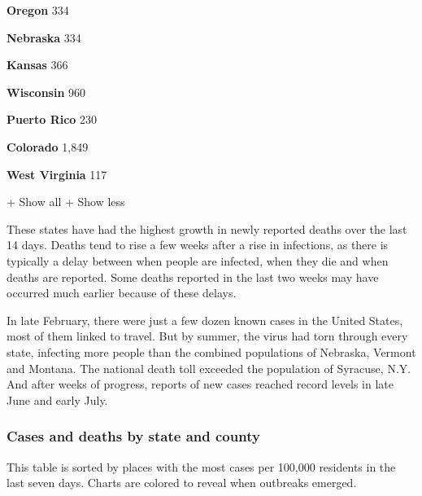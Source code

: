 \textbf{Oregon} 334

\href{https://www.nytimes.com/interactive/2020/us/nebraska-coronavirus-cases.html}{}

\textbf{Nebraska} 334

\href{https://www.nytimes.com/interactive/2020/us/kansas-coronavirus-cases.html}{}

\textbf{Kansas} 366

\href{https://www.nytimes.com/interactive/2020/us/wisconsin-coronavirus-cases.html}{}

\textbf{Wisconsin} 960

\href{https://www.nytimes.com/interactive/2020/us/puerto-rico-coronavirus-cases.html}{}

\textbf{Puerto Rico} 230

\href{https://www.nytimes.com/interactive/2020/us/colorado-coronavirus-cases.html}{}

\textbf{Colorado} 1,849

\href{https://www.nytimes.com/interactive/2020/us/west-virginia-coronavirus-cases.html}{}

\textbf{West Virginia} 117

+ Show all + Show less

These states have had the highest growth in newly reported deaths over
the last 14 days. Deaths tend to rise a few weeks after a rise in
infections, as there is typically a delay between when people are
infected, when they die and when deaths are reported. Some deaths
reported in the last two weeks may have occurred much earlier because of
these delays.

In late February, there were just a few dozen known cases in the United
States, most of them linked to travel. But by summer, the virus had torn
through every state, infecting more people than the combined populations
of Nebraska, Vermont and Montana. The national death toll exceeded the
population of Syracuse, N.Y. And after weeks of progress, reports of new
cases reached record levels in late June and early July.

\hypertarget{cases-and-deaths-by-state-and-county}{%
\subsubsection{Cases and deaths by state and
county}\label{cases-and-deaths-by-state-and-county}}

This table is sorted by places with the most cases per 100,000 residents
in the last seven days. Charts are colored to reveal when outbreaks
emerged.

